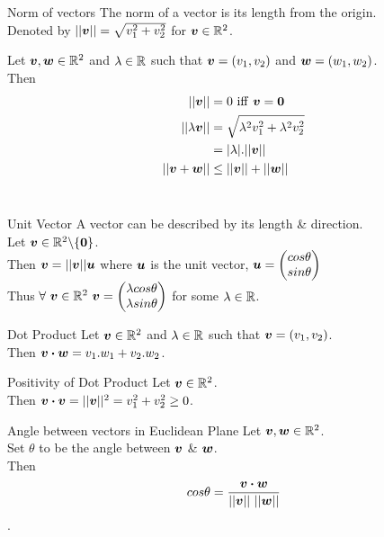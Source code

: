 \documentclass[11pt,a4paper]{article}
\begin{document}
\subtitle{Definition 1.04 - }{Norm of vectors}
The norm of a vector is its length from the origin. \\
Denoted by $||\boldsymbol{v}|| = \sqrt{v_{1}^{2} + v_{2}^{2}}$ for $\boldsymbol{v} \in \mathbb{R}^2$. \\

\subtitle{Theorem 1.05}{}
Let $\boldsymbol{v}, \boldsymbol{w} \in \mathbb{R}^2$ and $\lambda \in \mathbb{R} $ such that $\boldsymbol{v} = (v_1,v_2)$ and $\boldsymbol{w} = (w_1,w_2)$. \\
Then
\begin{align*}
  ||\boldsymbol{v}|| &= 0\ \mathrm{iff}\ \boldsymbol{v} = \boldsymbol{0}\\
  ||\lambda\boldsymbol{v}|| &= \sqrt{\lambda^2v_{1}^{2} + \lambda^2v_{2}^{2}} \\
  &= |\lambda|.||\boldsymbol{v}|| \\
  ||\boldsymbol{v} + \boldsymbol{w}|| &\leq ||\boldsymbol{v}|| + ||\boldsymbol{w}||
\end{align*} \\

\subtitle{Definition 1.06 - }{Unit Vector}
A vector can be described by its length \& direction. \\
Let $\boldsymbol{v} \in \mathbb{R}^2\backslash\{\boldsymbol{0}\}$. \\
Then $\boldsymbol{v} = ||\boldsymbol{v}||\boldsymbol{u}$ where $\boldsymbol{u}$ is the unit vector, $\boldsymbol{u} = \begin{pmatrix} cos\theta \\ sin\theta \end{pmatrix}$ \\
Thus $\forall\ \boldsymbol{v} \in \mathbb{R}^2\ \boldsymbol{v} = \begin{pmatrix} \lambda cos\theta \\ \lambda sin\theta \end{pmatrix}$ for some $\lambda \in \mathbb{R}$. \\

\subtitle{Definition 1.07 - }{Dot Product}
Let $\boldsymbol{v} \in \mathbb{R}^2$ and $\lambda \in \mathbb{R}$ such that $\boldsymbol{v} = (v_1,v_2)$. \\
Then $\boldsymbol{v} \boldsymbol{\cdot} \boldsymbol{w} = v_1.w_1 + v_2.w_2$. \\

\subtitle{Remark 1.08 - }{Positivity of Dot Product}
Let $\boldsymbol{v} \in \mathbb{R}^2$. \\
Then $\boldsymbol{v} \boldsymbol{\cdot} \boldsymbol{v} = ||\boldsymbol{v}||^2 = v_{1}^{2} + v_{2}^{2} \geq 0$. \\

\subtitle{Remark 1.09 - }{Angle between vectors in Euclidean Plane}
Let $\boldsymbol{v}, \boldsymbol{w} \in \mathbb{R}^2$. \\
Set $\theta$ to be the angle between $\boldsymbol{v}$ \& $\boldsymbol{w}$. \\
Then $$cos\theta = \frac{\boldsymbol{v} \boldsymbol{\cdot} \boldsymbol{w}}{||\boldsymbol{v}||\ ||\boldsymbol{w}||}$$.
\end{document}
